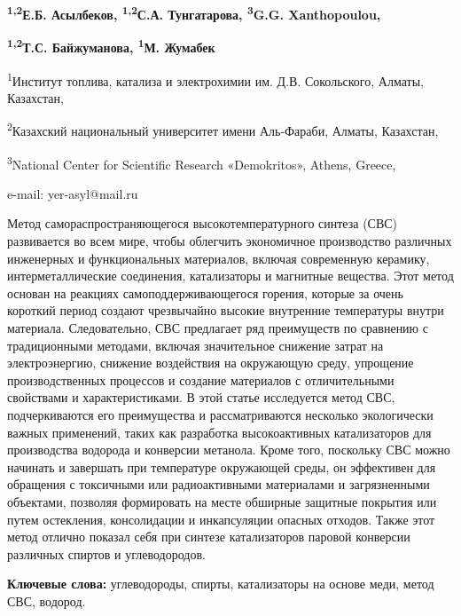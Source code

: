 
\begin{center}
{\bfseries \textsuperscript{1,2}Е.Б. Асылбеков, \textsuperscript{1,2}С.А.
Тунгатарова, \textsuperscript{3}G.G. Xanthopoulou,}

{\bfseries \textsuperscript{1,2}Т.С. Байжуманова, \textsuperscript{1}М.
Жумабек}

\textsuperscript{1}Институт топлива, катализа и электрохимии им. Д.В.
Сокольского, Алматы, Казахстан,

\textsuperscript{2}Казахский национальный университет имени Аль-Фараби,
Алматы, Казахстан,

\textsuperscript{3}National Center for Scientific Research «Demokritos»,
Athens, Greece,

e-mail: yer-asyl@mail.ru
\end{center}

Метод самораспространяющегося высокотемпературного синтеза (СВС)
развивается во всем мире, чтобы облегчить экономичное производство
различных инженерных и функциональных материалов, включая современную
керамику, интерметаллические соединения, катализаторы и магнитные
вещества. Этот метод основан на реакциях самоподдерживающегося горения,
которые за очень короткий период создают чрезвычайно высокие внутренние
температуры внутри материала. Следовательно, СВС предлагает ряд
преимуществ по сравнению с традиционными методами, включая значительное
снижение затрат на электроэнергию, снижение воздействия на окружающую
среду, упрощение производственных процессов и создание материалов с
отличительными свойствами и характеристиками. В этой статье исследуется
метод СВС, подчеркиваются его преимущества и рассматриваются несколько
экологически важных применений, таких как разработка высокоактивных
катализаторов для производства водорода и конверсии метанола. Кроме
того, поскольку СВС можно начинать и завершать при температуре
окружающей среды, он эффективен для обращения с токсичными или
радиоактивными материалами и загрязненными объектами, позволяя
формировать на месте обширные защитные покрытия или путем остекления,
консолидации и инкапсуляции опасных отходов. Также этот метод отлично
показал себя при синтезе катализаторов паровой конверсии различных
спиртов и углеводородов.

{\bfseries Ключевые слова:} углеводороды, спирты, катализаторы на основе
меди, метод СВС, водород.


